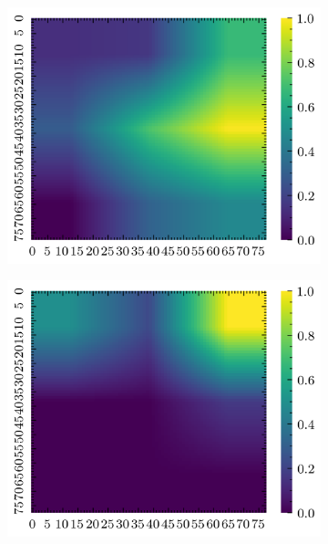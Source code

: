 \begin{figure}[H]
    \begin{subfigure}[b]{0.19\textwidth}
        \includegraphics[width=\linewidth]{../img/5/quarry/false_positive/grad-cam-2d-0.png}
    \end{subfigure}
    \begin{subfigure}[b]{0.19\textwidth}
        \includegraphics[width=\linewidth]{../img/5/quarry/false_positive/grad-cam-2d-1.png}
    \end{subfigure}  
    \begin{subfigure}[b]{0.19\textwidth}

\end{subfigure}
\end{figure}
